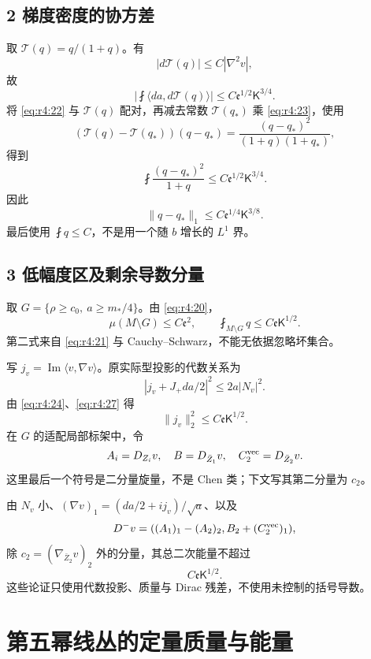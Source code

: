\documentclass[UTF8,11pt,openany,oneside,fontset=none]{ctexbook}
\begin{document}
\subsection{2 梯度密度的协方差}\label{ch4:ux68afux5ea6ux5bc6ux5ea6ux7684ux534fux65b9ux5dee}

取 \(\mathcal T(q)=q/(1+q)\)。有 \[
|d\mathcal T(q)|\le C|\nabla^2v|,
\] 故 \[
\left|\fint\langle da,d\mathcal T(q)\rangle\right|
\le C\mathfrak e^{1/2}\mathsf K^{3/4}.
\] 将 \eqref{eq:r4:22} 与 \(\mathcal T(q)\) 配对，再减去常数 \(\mathcal T(q_*)\) 乘 \eqref{eq:r4:23}，使用 \[
(\mathcal T(q)-\mathcal T(q_*))(q-q_*)
=\frac{(q-q_*)^2}{(1+q)(1+q_*)},
\] 得到 \[
\boxed{
\fint\frac{(q-q_*)^2}{1+q}
\le C\mathfrak e^{1/2}\mathsf K^{3/4}.
}
\tag{4.25}\label{eq:r4:25}
\] 因此 \[
\boxed{
\|q-q_*\|_1\le C\mathfrak e^{1/4}\mathsf K^{3/8}.
}
\tag{4.26}\label{eq:r4:26}
\] 最后使用 \(\fint q\le C\)，不是用一个随 \(b\) 增长的 \(L^1\) 界。

\subsection{3 低幅度区及剩余导数分量}\label{ch4:ux4f4eux5e45ux5ea6ux533aux53caux5269ux4f59ux5bfcux6570ux5206ux91cf}

取 \(G=\{\rho\ge c_0,\ a\ge m_*/4\}\)。由 \eqref{eq:r4:20}， \[
\mu(M\setminus G)\le C\mathfrak e^2,
\qquad
\fint_{M\setminus G}q\le C\mathfrak e\mathsf K^{1/2}.
\tag{4.27}\label{eq:r4:27}
\] 第二式来自 \eqref{eq:r4:21} 与 Cauchy--Schwarz，不能无依据忽略坏集合。

写 \(j_v=\operatorname{Im}\langle v,\nabla v\rangle\)。原实际型投影的代数关系为 \[
|j_v+J_+da/2|^2\le2a|N_v|^2.
\] 由 \eqref{eq:r4:24}、\eqref{eq:r4:27} 得 \[
\|j_v\|_2^2\le C\mathfrak e\mathsf K^{1/2}.
\tag{4.28}\label{eq:r4:28}
\] 在 \(G\) 的适配局部标架中，令 \[
A_i=\nabla_{Z_i}v,\quad B=\nabla_{\bar Z_1}v,\quad C_2^{\rm vec}=\nabla_{\bar Z_2}v.
\] 这里最后一个符号是二分量旋量，不是 Chen 类；下文写其第二分量为 \(c_2\)。

由 \(N_v\) 小、\((\nabla v)_1=(da/2+ij_v)/\sqrt a\)、以及 \[
D^-v=((A_1)_1-(A_2)_2,B_2+(C_2^{\rm vec})_1),
\] 除 \(c_2=(\nabla_{\bar Z_2}v)_2\) 外的分量，其总二次能量不超过 \[
C\mathfrak e\mathsf K^{1/2}.
\tag{4.29}\label{eq:r4:29}
\] 这些论证只使用代数投影、质量与 Dirac 残差，不使用未控制的括号导数。

\section{第五幂线丛的定量质量与能量}\label{ch4:ux7b2cux4e94ux5e42ux7ebfux4e1bux7684ux5b9aux91cfux8d28ux91cfux4e0eux80fdux91cf}
\end{document}
